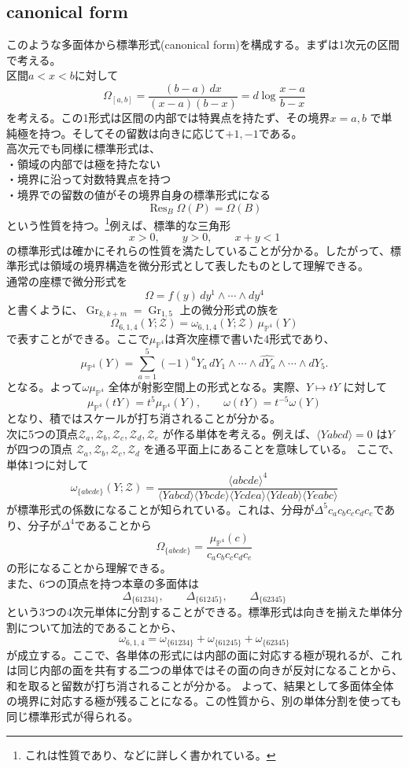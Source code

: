 \documentclass[uplatex,dvipdfmx,a4paper,11pt]{jsarticle}
\numberwithin{equation}{section}
\begin{document}
\subsection{canonical form}
このような多面体から標準形式(canonical form)を構成する。まずは1次元の区間で考える。\\
区間$a<x<b$に対して
\[
\Omega_{[a,b]}
=
\frac{(b-a)\,dx}{(x-a)(b-x)}
=
d\log\frac{x-a}{b-x}
\]
を考える。この1形式は区間の内部では特異点を持たず、その境界\(x=a,b\) で単純極を持つ。そしてその留数は向きに応じて$+1,-1$である。\\
高次元でも同様に標準形式は、\\
・領域の内部では極を持たない\\
・境界に沿って対数特異点を持つ\\
・境界での留数の値がその境界自身の標準形式になる
\[
\operatorname{Res}_{B}\Omega(P)=\Omega(B)
\]
という性質を持つ。\footnote{これは性質であり、\cite{AHBL2017}などに詳しく書かれている。}例えば、標準的な三角形
\[
x>0,\qquad y>0,\qquad x+y<1
\]
の標準形式は確かにそれらの性質を満たしていることが分かる。したがって、標準形式は領域の境界構造を微分形式として表したものとして理解できる。\\
通常の座標で微分形式を
\[
\Omega=f(y)\,dy^1\wedge\cdots\wedge dy^4
\]
と書くように、$\operatorname{Gr}_{k,k+m}=\operatorname{Gr}_{1,5}$ 上の微分形式の族を
\[
\Omega_{6,1,4}(Y;\mathcal Z)
=
\omega_{6,1,4}(Y;\mathcal Z)\,
\mu_{\mathbb P^4}(Y)
\]
で表すことができる。ここで\(\mu_{\mathbb P^4}\)は斉次座標で書いた4形式であり、
\[
\mu_{\mathbb P^4}(Y)
=
\sum_{a=1}^{5}
(-1)^aY_a\,
dY_1\wedge\cdots\wedge
\widehat{dY_a}\wedge\cdots\wedge dY_5.
\]
となる。よって\(\omega\mu_{\mathbb P^4}\) 全体が射影空間上の形式となる。実際、\(Y\mapsto tY\) に対して
\[
\mu_{\mathbb P^4}(tY)=t^5\mu_{\mathbb P^4}(Y),
\qquad
\omega(tY)=t^{-5}\omega(Y)
\]
となり、積ではスケールが打ち消されることが分かる。\\
次に5つの頂点$\mathcal Z_a,\mathcal Z_b,\mathcal Z_c,
\mathcal Z_d,\mathcal Z_e$
が作る単体を考える。例えば、$\langle Yabcd\rangle=0$ は\(Y\) が四つの頂点 \(\mathcal Z_a,\mathcal Z_b,\mathcal Z_c,\mathcal Z_d\) を通る平面上にあることを意味している。
ここで、単体1つに対して
\[
\omega_{\{abcde\}}(Y;\mathcal Z)
=
\frac{\langle abcde\rangle^4}{
\langle Yabcd\rangle
\langle Ybcde\rangle
\langle Ycdea\rangle
\langle Ydeab\rangle
\langle Yeabc\rangle
}
\]
が標準形式の係数になることが知られている。これは、分母が$\Delta^5c_ac_bc_cc_dc_e$であり、分子が$\Delta^4$であることから
\[
\Omega_{\{abcde\}}
=
\frac{\mu_{\mathbb P^4}(c)}
{c_ac_bc_cc_dc_e}
\]
の形になることから理解できる。\\
また、6つの頂点を持つ本章の多面体は
\[
\Delta_{\{61234\}},
\qquad
\Delta_{\{61245\}},
\qquad
\Delta_{\{62345\}}
\]
という3つの4次元単体に分割することができる。標準形式は向きを揃えた単体分割について加法的であることから、
\[
\omega_{6,1,4}
=
\omega_{\{61234\}}
+\omega_{\{61245\}}
+\omega_{\{62345\}}
\]
が成立する。ここで、各単体の形式には内部の面に対応する極が現れるが、これは同じ内部の面を共有する二つの単体ではその面の向きが反対になることから、和を取ると留数が打ち消されることが分かる。
よって、結果として多面体全体の境界に対応する極が残ることになる。この性質から、別の単体分割を使っても同じ標準形式が得られる。
\end{document}
